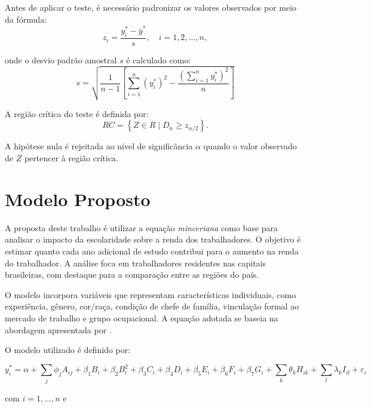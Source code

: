 \documentclass[12pt,a4paper,header]{abnt}
\begin{document}
Antes de aplicar o teste, é necessário padronizar os valores observados por meio da fórmula:
\begin{equation}
    z_i = \frac{y_i^* - \bar{y}^*}{s}, \quad i = 1, 2, \ldots, n,
\end{equation}

onde o desvio padrão amostral $s$ é calculado como:
\begin{equation}
s = \sqrt{ \frac{1}{n - 1} \left[ \sum_{i=1}^{n} (y_i^*)^2 - \frac{\left( \sum_{i=1}^{n} y_i^* \right)^2}{n} \right] }
\end{equation}

A região crítica do teste é definida por:
\begin{equation*}
    RC = \left\{ Z \in R \mid D_n \geq z_{\alpha/2} \right\}.
\end{equation*}

A hipótese nula é rejeitada ao nível de significância $\alpha$ quando o valor observado de $Z$ pertencer à região crítica.


\section{Modelo Proposto}
A proposta deste trabalho é utilizar a equação \textit{minceriana} \cite{mincer1974} como base para analisar o impacto da escolaridade sobre a renda dos trabalhadores. O objetivo é estimar quanto cada ano adicional de estudo contribui para o aumento na renda do trabalhador. A análise foca em trabalhadores residentes nas capitais brasileiras, com destaque para a comparação entre as regiões do país.

O modelo incorpora variáveis que representam características individuais, como experiência, gênero, cor/raça, condição de chefe de família, vinculação formal ao mercado de trabalho e grupo ocupacional. A equação adotada se baseia na abordagem apresentada por .

O modelo utilizado é definido por:

\begin{equation}
    y_i^* = \alpha + \sum_{j} \phi_j A_{ij} + \beta_1 B_i + \beta_2 B_i^2 + \beta_3 C_i + \beta_4 D_i + \beta_5 E_i + \beta_6 F_i + \beta_7 G_i + \sum_k \theta_k H_{ik} + \sum_l \lambda_k I_{il} + \varepsilon_i
\end{equation}

\noindent com $i = 1, \ldots, n$ e
\end{document}
